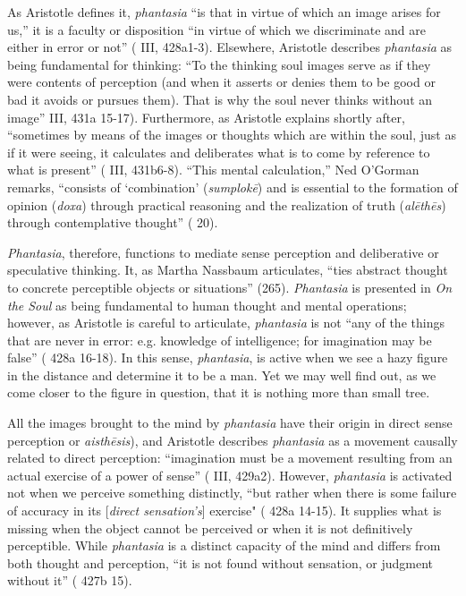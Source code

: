\documentclass{article}
\begin{document}
 As Aristotle defines it, \textit{phantasia} ``is that in virtue of which an image arises for us,'' it is a faculty or disposition  ``in virtue of which we discriminate and are either in error or not'' (\cite{aristotle2014soul} III, 428a1-3). Elsewhere, Aristotle describes \textit{phantasia} as being fundamental for thinking: ``To the thinking soul images serve as if they were contents of perception (and when it asserts or denies them to be good or bad it avoids or pursues them). That is why the soul never thinks without an image'' \cite{aristotle2014soul} III, 431a 15-17). Furthermore, as Aristotle explains shortly after, ``sometimes by means of the images or thoughts which are within the soul, just as if it were seeing, it calculates and deliberates what is to come by reference to what is present'' (\cite{aristotle2014soul} III, 431b6-8). ``This mental calculation,'' Ned O'Gorman remarks, ``consists of `combination' (\textit{sumplokē}) and is essential to the formation of opinion (\textit{doxa}) through practical reasoning and the realization of truth (\textit{alēthēs}) through contemplative thought'' (\cite{ogorman_aristotles_phantasia} 20). 

\textit{Phantasia}, therefore, functions to mediate sense perception and deliberative or speculative thinking. It, as Martha Nassbaum articulates, “ties abstract thought to concrete perceptible objects or situations” (265). \textit{Phantasia} is presented in \textit{On the Soul} as being fundamental to human thought and mental operations; however, as Aristotle is careful to articulate, \textit{phantasia} is not ``any of the things that are never in error: e.g. knowledge of intelligence; for imagination may be false'' (\cite{aristotle2014soul} 428a 16-18). In this sense, \textit{phantasia}, is active when we see a hazy figure in the distance and determine it to be a man. Yet we may well find out, as we come closer to the figure in question, that it is nothing more than small tree. 

All the images brought to the mind by \textit{phantasia} have their origin in direct sense perception or \textit{aisthēsis}), and Aristotle describes \textit{phantasia} as a movement causally related to direct perception: ``imagination must be a movement resulting from an actual exercise of a power of sense'' (\cite{aristotle2014soul} III, 429a2). However, \textit{phantasia} is activated not when we perceive something distinctly, ``but rather when there is some failure of accuracy in its [\textit{direct sensation's}] exercise" (\cite{aristotle2014soul} 428a 14-15). It supplies what is missing when the object cannot be perceived or when it is not definitively perceptible. While \textit{phantasia} is a distinct capacity of the mind and differs from both thought and perception, ``it is not found without sensation, or judgment without it'' (\cite{aristotle2014soul} 427b 15). 
\end{document}
